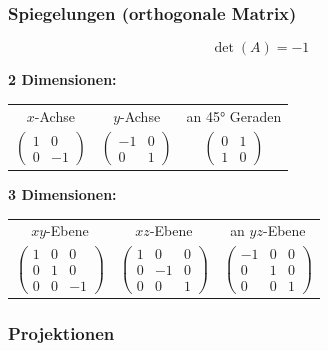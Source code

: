 		
\subsubsection{Spiegelungen (orthogonale Matrix)}

\vspace{-0.2cm}
$$ \det(A) = -1 $$

\textbf{2 Dimensionen:}
\vspace{0.2cm}
\begin{tabular}{ccc}
	$x$-Achse & $y$-Achse & an 45° Geraden \\
	
	$\begin{pmatrix} 1 & 0 \\ 0 & -1 \end{pmatrix}$ & $\begin{pmatrix} -1 & 0 \\ 0 & 1 \end{pmatrix}$ & $\begin{pmatrix} 0 & 1 \\ 1 & 0 \end{pmatrix}$
\end{tabular}

\vspace{0.2cm}

\textbf{3 Dimensionen:}
\vspace{0.2cm}
\begin{tabular}{ccc}
	$xy$-Ebene & $xz$-Ebene & an $yz$-Ebene\\
	$\begin{pmatrix} 1 & 0 & 0 \\ 0 & 1 & 0 \\ 0 & 0 & -1 \end{pmatrix}$ & $\begin{pmatrix} 1 & 0 & 0 \\ 0 & -1 & 0 \\ 0 & 0 & 1 \end{pmatrix}$ & $\begin{pmatrix} -1 & 0 & 0 \\ 0 & 1 & 0 \\ 0 & 0 & 1 \end{pmatrix}$ \\
\end{tabular}		  	
\vspace{0.2cm}	


\subsubsection{Projektionen}		

